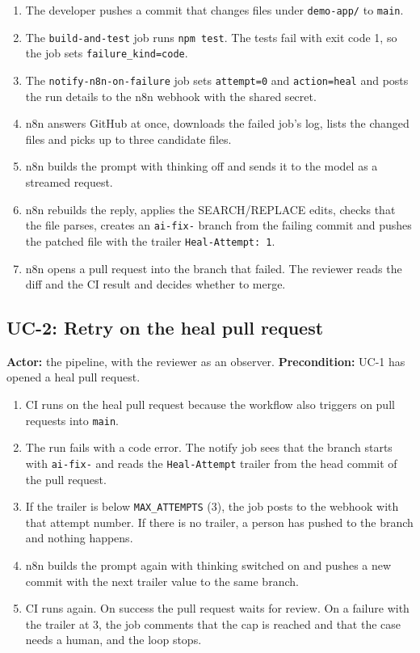 \begin{enumerate}
  \item The developer pushes a commit that changes files under \texttt{demo-app/\allowbreak{}} to \texttt{main}.
  \item The \texttt{build-and-test} job runs \texttt{npm test}. The tests fail with exit code 1, so the job sets \texttt{failure\_kind=code}.
  \item The \texttt{notify-n8n-on-failure} job sets \texttt{attempt=0} and \texttt{action=heal} and posts the run details to the n8n webhook with the shared secret.
  \item n8n answers GitHub at once, downloads the failed job's log, lists the changed files and picks up to three candidate files.
  \item n8n builds the prompt with thinking off and sends it to the model as a streamed request.
  \item n8n rebuilds the reply, applies the SEARCH/REPLACE edits, checks that the file parses, creates an \texttt{ai-fix-} branch from the failing commit and pushes the patched file with the trailer \texttt{Heal-Attempt: 1}.
  \item n8n opens a pull request into the branch that failed. The reviewer reads the diff and the CI result and decides whether to merge.
\end{enumerate}

\subsection{UC-2: Retry on the heal pull request}

\textbf{Actor:} the pipeline, with the reviewer as an observer. \textbf{Precondition:} UC-1 has opened a heal pull request.

\begin{enumerate}
  \item CI runs on the heal pull request because the workflow also triggers on pull requests into \texttt{main}.
  \item The run fails with a code error. The notify job sees that the branch starts with \texttt{ai-fix-} and reads the \texttt{Heal-Attempt} trailer from the head commit of the pull request.
  \item If the trailer is below \texttt{MAX\_ATTEMPTS} (3), the job posts to the webhook with that attempt number. If there is no trailer, a person has pushed to the branch and nothing happens.
  \item n8n builds the prompt again with thinking switched on and pushes a new commit with the next trailer value to the same branch.
  \item CI runs again. On success the pull request waits for review. On a failure with the trailer at 3, the job comments that the cap is reached and that the case needs a human, and the loop stops.
\end{enumerate}

